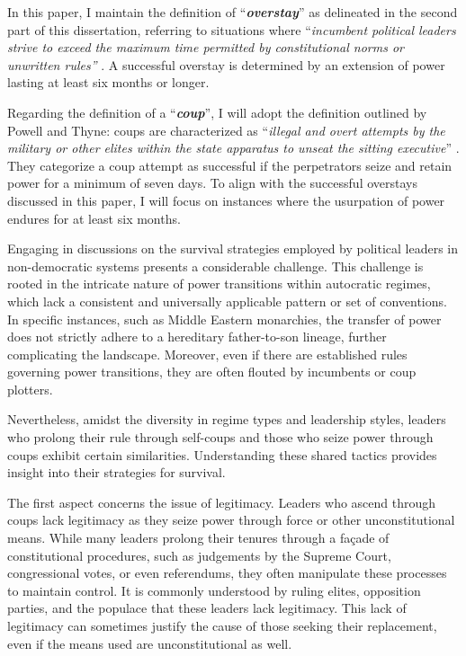 \documentclass[
  12pt,
  a4paper,
  12pt]{article}
\begin{document}
In this paper, I maintain the definition of ``\textbf{\emph{overstay}}''
as delineated in the second part of this dissertation, referring to
situations where ``\emph{incumbent political leaders strive to exceed
the maximum time permitted by constitutional norms or unwritten rules''}
\citep[p5]{zhu2024}. A successful overstay is determined by an extension
of power lasting at least six months or longer.

Regarding the definition of a ``\textbf{\emph{coup}}'', I will adopt the
definition outlined by Powell and Thyne: coups are characterized as
``\emph{illegal and overt attempts by the military or other elites
within the state apparatus to unseat the sitting executive}''
\citep[p252]{powell2011}. They categorize a coup attempt as successful
if the perpetrators seize and retain power for a minimum of seven days.
To align with the successful overstays discussed in this paper, I will
focus on instances where the usurpation of power endures for at least
six months.

Engaging in discussions on the survival strategies employed by political
leaders in non-democratic systems presents a considerable challenge.
This challenge is rooted in the intricate nature of power transitions
within autocratic regimes, which lack a consistent and universally
applicable pattern or set of conventions. In specific instances, such as
Middle Eastern monarchies, the transfer of power does not strictly
adhere to a hereditary father-to-son lineage, further complicating the
landscape. Moreover, even if there are established rules governing power
transitions, they are often flouted by incumbents or coup plotters.

Nevertheless, amidst the diversity in regime types and leadership
styles, leaders who prolong their rule through self-coups and those who
seize power through coups exhibit certain similarities. Understanding
these shared tactics provides insight into their strategies for
survival.

The first aspect concerns the issue of legitimacy. Leaders who ascend
through coups lack legitimacy as they seize power through force or other
unconstitutional means. While many leaders prolong their tenures through
a façade of constitutional procedures, such as judgements by the Supreme
Court, congressional votes, or even referendums, they often manipulate
these processes to maintain control. It is commonly understood by ruling
elites, opposition parties, and the populace that these leaders lack
legitimacy. This lack of legitimacy can sometimes justify the cause of
those seeking their replacement, even if the means used are
unconstitutional as well.
\end{document}
